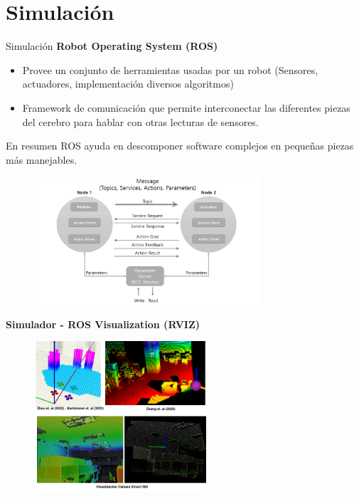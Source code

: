\documentclass[
  24pt, %
  aspectratio=169, %
]{beamer}
\begin{document}
\section{Simulación}
\begin{frame}{Simulación}
  \textbf{Robot Operating System (ROS)}\\
  \bigskip %
  \begin{itemize}
  \item Provee un conjunto de herramientas usadas por un robot (Sensores, actuadores, implementación diversos algoritmos)
  \item Framework de comunicación que permite interconectar las diferentes piezas del cerebro para hablar con otras lecturas de sensores.
  \end{itemize}
  \bigskip %
  En resumen ROS ayuda en descomponer software complejos en pequeñas piezas más manejables.
  
\end{frame}

\begin{frame}
  \begin{figure}
    \centering
    \includegraphics[width=0.75\textwidth]{ros_1}
  \end{figure}
\end{frame}

\begin{frame}
  \textbf{Simulador -  ROS Visualization (RVIZ)}
  \begin{figure}
    \centering
    \includegraphics[width=0.57\textwidth]{visual}
  \end{figure}
\end{frame}
\end{document}

